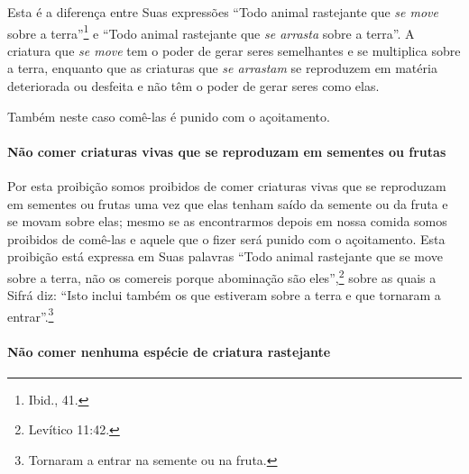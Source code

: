 Esta é a diferença entre Suas expressões ``Todo animal rastejante que
\emph{se move} sobre a terra''\footnote{Ibid., 41.} e ``Todo animal rastejante
que \emph{se arrasta} sobre a terra''. A criatura que \emph{se move} tem
o poder de gerar seres semelhantes e se multiplica sobre a terra,
enquanto que as criaturas que \emph{se arrastam} se reproduzem em
matéria deteriorada ou desfeita e não têm o poder de gerar seres como
elas.

Também neste caso comê-las é punido com o açoitamento.

\paragraph{Não comer criaturas vivas que se reproduzam em sementes ou frutas}

Por esta proibição somos proibidos de comer criaturas vivas que se
reproduzam em sementes ou frutas uma vez que elas tenham saído da
semente ou da fruta e se movam sobre elas; mesmo se as encontrarmos
depois em nossa comida somos proibidos de comê-las e aquele que o fizer
será punido com o açoitamento. Esta proibição está expressa em Suas
palavras ``Todo animal rastejante que se move sobre a terra, não os
comereis porque abominação são eles'',\footnote{Levítico 11:42.} sobre as quais a
Sifrá diz: ``Isto inclui também os que estiveram sobre a terra e que
tornaram a entrar''.\footnote{Tornaram a entrar na semente ou na fruta.}

\paragraph{Não comer nenhuma espécie de criatura rastejante}

